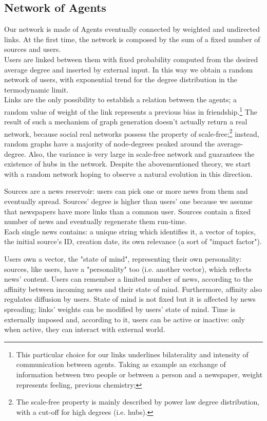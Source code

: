 \subsection{Network of Agents}\label{subsec:network}
Our network is made of Agents eventually connected by weighted and undirected links.
At the first time, the network is composed by the sum of a fixed number of sources and users. \\
Users are linked between them with fixed probability computed from the desired average degree and inserted by external input.
 In this way we obtain a random network of users, with exponential trend for the degree distribution in the termodynamic limit.
\\ Links are the only possibility to establish a relation between the agents; a random value of weight of the link represents a previous bias in 
friendship.\footnote{This particular choice for our links underlines bilaterality and intensity of communication between agents.
Taking as example an exchange of information between two people or between a person and a newspaper, weight represents feeling, previous chemistry;}
The result of such a mechanism of graph generation doesn't actually return a real network, because social real networks possess the property of 
scale-free;\footnote{The scale-free property is mainly described by power law degree distribution, with a cut-off for high degrees (i.e. hubs). } instead, random graphs have a majority of node-degrees peaked around the average-degree. 
Also, the variance is very large in scale-free network and guarantees the existence of hubs in the network.
Despite the abovementioned theory, we start with a random network hoping to observe a natural evolution in this direction.

Sources are a news reservoir: users can pick one or more news from them and eventually spread.
Sources' degree is higher than users' one because we assume that newspapers have more links than a common user.
Sources contain a fixed number of news and eventually regenerate them run-time. \\
Each single news contains: a unique string which identifies it, a vector of topics, the initial source's ID, creation date, its own relevance (a sort of "impact factor").

Users own a vector, the "state of mind", representing their own personality: sources, like users, have a "personality" too (i.e. another vector), which reflects news' content.
Users can remember a limited number of news, according to the affinity between incoming news and their state of mind.
Furthermore, affinity also regulates diffusion by users.
State of mind is not fixed but it is affected by news spreading; links' weights can be modified by users' state of mind.
Time is externally imposed and, according to it, users can be active or inactive: only when active, they can interact with external world.


